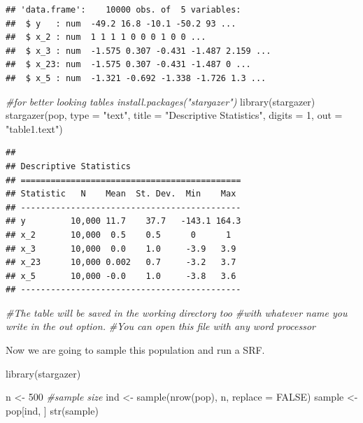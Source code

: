 \documentclass[
]{book}
\newenvironment{Shaded}{\begin{snugshade}}{\end{snugshade}}
\newcommand{\AttributeTok}[1]{\textcolor[rgb]{0.77,0.63,0.00}{#1}}
\newcommand{\CommentTok}[1]{\textcolor[rgb]{0.56,0.35,0.01}{\textit{#1}}}
\newcommand{\ConstantTok}[1]{\textcolor[rgb]{0.00,0.00,0.00}{#1}}
\newcommand{\DecValTok}[1]{\textcolor[rgb]{0.00,0.00,0.81}{#1}}
\newcommand{\FunctionTok}[1]{\textcolor[rgb]{0.00,0.00,0.00}{#1}}
\newcommand{\NormalTok}[1]{#1}
\newcommand{\OtherTok}[1]{\textcolor[rgb]{0.56,0.35,0.01}{#1}}
\newcommand{\StringTok}[1]{\textcolor[rgb]{0.31,0.60,0.02}{#1}}
\begin{document}
\begin{verbatim}
## 'data.frame':    10000 obs. of  5 variables:
##  $ y   : num  -49.2 16.8 -10.1 -50.2 93 ...
##  $ x_2 : num  1 1 1 1 0 0 0 1 0 0 ...
##  $ x_3 : num  -1.575 0.307 -0.431 -1.487 2.159 ...
##  $ x_23: num  -1.575 0.307 -0.431 -1.487 0 ...
##  $ x_5 : num  -1.321 -0.692 -1.338 -1.726 1.3 ...
\end{verbatim}

\begin{Shaded}
\begin{Highlighting}[]
\CommentTok{\#for better looking tables install.packages("stargazer")}
\FunctionTok{library}\NormalTok{(stargazer)}
\FunctionTok{stargazer}\NormalTok{(pop, }\AttributeTok{type =} \StringTok{"text"}\NormalTok{, }\AttributeTok{title =} \StringTok{"Descriptive Statistics"}\NormalTok{,}
          \AttributeTok{digits =} \DecValTok{1}\NormalTok{, }\AttributeTok{out =} \StringTok{"table1.text"}\NormalTok{)}
\end{Highlighting}
\end{Shaded}

\begin{verbatim}
## 
## Descriptive Statistics
## ============================================
## Statistic   N    Mean  St. Dev.  Min    Max 
## --------------------------------------------
## y         10,000 11.7    37.7   -143.1 164.3
## x_2       10,000  0.5    0.5      0      1  
## x_3       10,000  0.0    1.0     -3.9   3.9 
## x_23      10,000 0.002   0.7     -3.2   3.7 
## x_5       10,000 -0.0    1.0     -3.8   3.6 
## --------------------------------------------
\end{verbatim}

\begin{Shaded}
\begin{Highlighting}[]
\CommentTok{\#The table will be saved in the working directory too}
\CommentTok{\#with whatever name you write in the out option.}
\CommentTok{\#You can open this file with any word processor}
\end{Highlighting}
\end{Shaded}

Now we are going to sample this population and run a SRF.

\begin{Shaded}
\begin{Highlighting}[]
\FunctionTok{library}\NormalTok{(stargazer)}

\NormalTok{n }\OtherTok{\textless{}{-}} \DecValTok{500} \CommentTok{\#sample size}
\NormalTok{ind }\OtherTok{\textless{}{-}} \FunctionTok{sample}\NormalTok{(}\FunctionTok{nrow}\NormalTok{(pop), n, }\AttributeTok{replace =} \ConstantTok{FALSE}\NormalTok{)}
\NormalTok{sample }\OtherTok{\textless{}{-}}\NormalTok{ pop[ind, ]}
\FunctionTok{str}\NormalTok{(sample)}
\end{Highlighting}
\end{Shaded}
\end{document}
